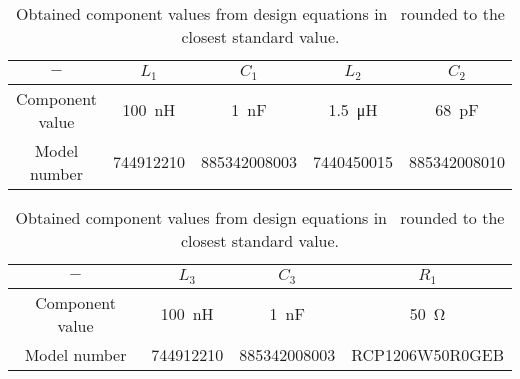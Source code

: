 \begin{table}[ptbh]
	\centering
	\begin{tabular}{|c c c c c|}
		\hline
		$-$ & $L_1$ & $C_1$ & $L_2$ & $C_2$ \\
		\hline
		Component value & \SI{100}{\nano\henry} & \SI{1}{\nano\farad} & \SI{1.5}{\micro\henry} & \SI{68}{\pico\farad}\\
		Model number & 744912210 & 885342008003 & 7440450015 & 885342008010\\
		\hline
	\end{tabular} 
	\begin{tabular}{|c c c c|}
		\hline
		$-$ & $L_3$ & $C_3$ & $R_1$\\
		\hline
		Component value & \SI{100}{\nano\henry} & \SI{1}{\nano\farad} & \SI{50}{\ohm}\\
		Model number & 744912210 & 885342008003 & RCP1206W50R0GEB\\
		\hline
	\end{tabular}
	\caption{Obtained component values from design equations in~\cite{lam} rounded to the closest standard value.}
	\label{tab:bpf_val}
\end{table}
